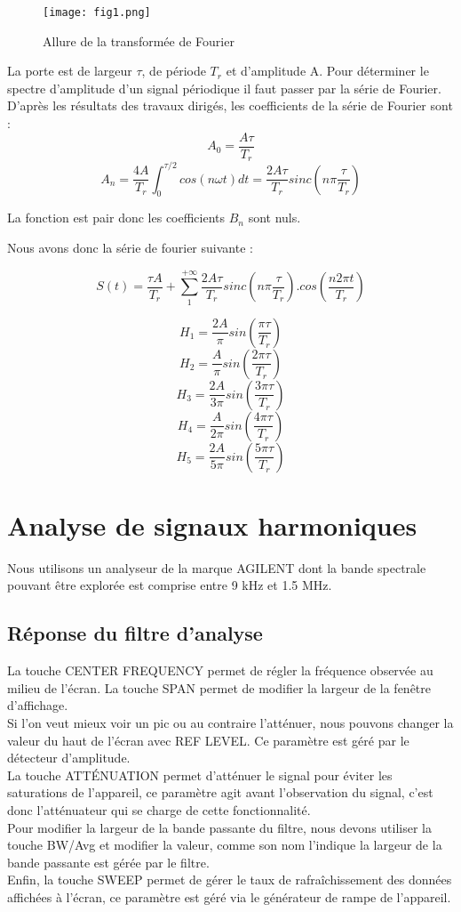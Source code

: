 \documentclass[oneside,a4paper,12pt]{article}
\begin{document}
		\begin{figure}[h]
			\centering
			\texttt{[image: fig1.png]}
			\caption{Allure de la transformée de Fourier}
		\end{figure}
	
		La porte est de largeur $\tau$, de période $T_{r}$  et d’amplitude A.
		Pour déterminer le spectre d’amplitude d’un signal périodique il faut passer par la série de Fourier.\\
		D’après les résultats des travaux dirigés, les coefficients de la série de Fourier sont :
		$$ A_{0} = \frac{A\tau}{T_{r}} $$
		$$ A_{n} = \frac{4 A}{T_{r}}\int_{0}^{\tau / 2} cos(n \omega t) dt = \frac{2 A \tau}{T_{r}} sinc(n \pi \frac{\tau}{T_{r}}) $$
		
		La fonction est pair donc les coefficients $B_{n}$ sont nuls. 

		Nous avons donc la série de fourier suivante : 
		
		$$ S(t) = \frac{\tau A}{T_{r}} + \sum_{1}^{+ \infty} \frac{2 A \tau}{T_{r}} sinc(n \pi \frac{\tau}{T_{r}}).cos(\frac{n 2 \pi t}{T_{r}}) $$
		
		$$ H_{1} = \frac{2 A}{\pi} sin(\frac{\pi \tau}{T_{r}}) $$
		$$ H_{2} = \frac{A}{\pi} sin(\frac{2 \pi \tau}{T_{r}}) $$
		$$ H_{3} = \frac{2A}{3 \pi} sin(\frac{3 \pi \tau}{T_{r}}) $$
		$$ H_{4} = \frac{A}{2 \pi} sin(\frac{4 \pi \tau}{T_{r}}) $$
		$$ H_{5} = \frac{2 A}{5 \pi} sin(\frac{5 \pi \tau}{T_{r}}) $$
	
	\section{Analyse de signaux harmoniques}
	
	Nous utilisons un analyseur de la marque AGILENT dont la bande spectrale pouvant être explorée est comprise entre 9 kHz et 1.5 MHz.
	
	\subsection{Réponse du filtre d'analyse}
	
	La touche CENTER FREQUENCY permet de régler la fréquence observée au milieu de l’écran.
	La touche SPAN permet de modifier la largeur de la fenêtre d’affichage.\\
	Si l’on veut mieux voir un pic ou au contraire l’atténuer, nous pouvons changer la valeur du haut de l’écran avec REF LEVEL. Ce paramètre est géré par le détecteur d’amplitude. \\
	La touche ATTÉNUATION permet d’atténuer le signal pour éviter les saturations de l’appareil, ce paramètre agit avant l’observation du signal, c’est donc l’atténuateur qui se charge de cette fonctionnalité.\\
	Pour modifier la largeur de la bande passante du filtre, nous devons utiliser la touche BW/Avg et modifier la valeur, comme son nom l’indique la largeur de la bande passante est gérée par le filtre.\\
	Enfin, la touche SWEEP permet de gérer le taux de rafraîchissement des données affichées à l’écran, ce paramètre est géré via le générateur de rampe de l’appareil.
	
\end{document}

